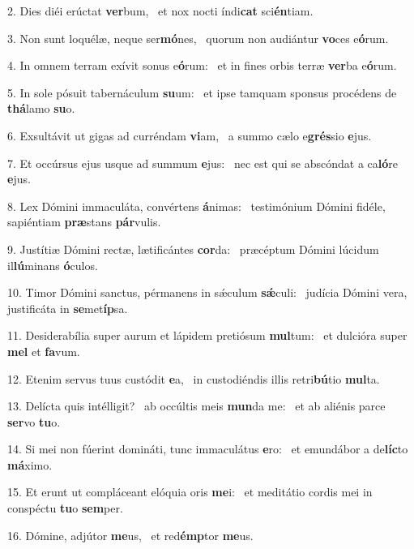 2. Dies diéi erúctat \textbf{ver}bum, \ast\  et nox nocti índi\textbf{cat} sci\textbf{én}tiam.\

3. Non sunt loquélæ, neque ser\textbf{mó}nes, \ast\  quorum non audiántur \textbf{vo}ces e\textbf{ó}rum.\

4. In omnem terram exívit sonus e\textbf{ó}rum: \ast\  et in fines orbis terræ \textbf{ver}ba e\textbf{ó}rum.\

5. In sole pósuit tabernáculum \textbf{su}um: \ast\  et ipse tamquam sponsus procédens de \textbf{thá}lamo \textbf{su}o.\

6. Exsultávit ut gigas ad curréndam \textbf{vi}am, \ast\  a summo cælo e\textbf{grés}sio \textbf{e}jus.\

7. Et occúrsus ejus usque ad summum \textbf{e}jus: \ast\  nec est qui se abscóndat a ca\textbf{ló}re \textbf{e}jus.\

8. Lex Dómini immaculáta, convértens \textbf{á}nimas: \ast\  testimónium Dómini fidéle, sapiéntiam \textbf{præ}stans \textbf{pár}vulis.\

9. Justítiæ Dómini rectæ, lætificántes \textbf{cor}da: \ast\  præcéptum Dómini lúcidum il\textbf{lú}minans \textbf{ó}culos.\

10. Timor Dómini sanctus, pérmanens in sǽculum \textbf{sǽ}culi: \ast\  judícia Dómini vera, justificáta in \textbf{se}met\textbf{íp}sa.\

11. Desiderabília super aurum et lápidem pretiósum \textbf{mul}tum: \ast\  et dulcióra super \textbf{mel} et \textbf{fa}vum.\

12. Etenim servus tuus custódit \textbf{e}a, \ast\  in custodiéndis illis retri\textbf{bú}tio \textbf{mul}ta.\

13. Delícta quis intélligit? \dag\  ab occúltis meis \textbf{mun}da me: \ast\  et ab aliénis parce \textbf{ser}vo \textbf{tu}o.\

14. Si mei non fúerint domináti, tunc immaculátus \textbf{e}ro: \ast\  et emundábor a de\textbf{líc}to \textbf{má}ximo.\

15. Et erunt ut compláceant elóquia oris \textbf{me}i: \ast\  et meditátio cordis mei in conspéctu \textbf{tu}o \textbf{sem}per.\

16. Dómine, adjútor \textbf{me}us, \ast\  et red\textbf{émp}tor \textbf{me}us.\

